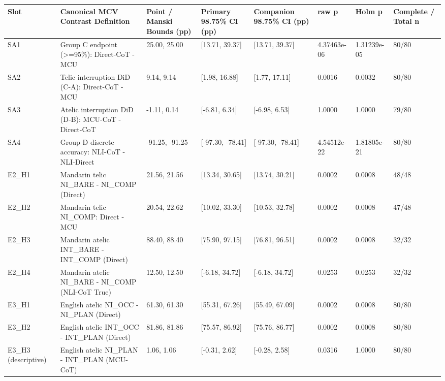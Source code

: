 \documentclass[11pt,a4paper]{article}
\begin{document}
\begin{center}\begingroup\small\setlength{\tabcolsep}{4.5pt}\renewcommand{\arraystretch}{1.12}\begin{adjustbox}{max width=\textwidth}\begin{tabular}{llllllll}\toprule
\textbf{Slot} & \textbf{Canonical MCV Contrast Definition} & \textbf{Point / Manski Bounds (pp)} & \textbf{Primary 98.75\% CI (pp)} & \textbf{Companion 98.75\% CI (pp)} & \textbf{raw p} & \textbf{Holm p} & \textbf{Complete / Total n} \\ \midrule
SA1 & Group C endpoint (>=95\%): Direct-CoT - MCU & 25.00, 25.00 & [13.71, 39.37] & [13.71, 39.37] & 4.37463e-06 & 1.31239e-05 & 80/80 \\
SA2 & Telic interruption DiD (C-A): Direct-CoT - MCU & 9.14, 9.14 & [1.98, 16.88] & [1.77, 17.11] & 0.0016 & 0.0032 & 80/80 \\
SA3 & Atelic interruption DiD (D-B): MCU-CoT - Direct-CoT & -1.11, 0.14 & [-6.81, 6.34] & [-6.98, 6.53] & 1.0000 & 1.0000 & 79/80 \\
SA4 & Group D discrete accuracy: NLI-CoT - NLI-Direct & -91.25, -91.25 & [-97.30, -78.41] & [-97.30, -78.41] & 4.54512e-22 & 1.81805e-21 & 80/80 \\
E2\_\allowbreak{}H1 & Mandarin telic NI\_\allowbreak{}BARE - NI\_\allowbreak{}COMP (Direct) & 21.56, 21.56 & [13.34, 30.65] & [13.74, 30.21] & 0.0002 & 0.0008 & 48/48 \\
E2\_\allowbreak{}H2 & Mandarin telic NI\_\allowbreak{}COMP: Direct - MCU & 20.54, 22.62 & [10.02, 33.30] & [10.53, 32.78] & 0.0002 & 0.0008 & 47/48 \\
E2\_\allowbreak{}H3 & Mandarin atelic INT\_\allowbreak{}BARE - INT\_\allowbreak{}COMP (Direct) & 88.40, 88.40 & [75.90, 97.15] & [76.81, 96.51] & 0.0002 & 0.0008 & 32/32 \\
E2\_\allowbreak{}H4 & Mandarin atelic NI\_\allowbreak{}BARE - NI\_\allowbreak{}COMP (NLI-CoT True) & 12.50, 12.50 & [-6.18, 34.72] & [-6.18, 34.72] & 0.0253 & 0.0253 & 32/32 \\
E3\_\allowbreak{}H1 & English atelic NI\_\allowbreak{}OCC - NI\_\allowbreak{}PLAN (Direct) & 61.30, 61.30 & [55.31, 67.26] & [55.49, 67.09] & 0.0002 & 0.0008 & 80/80 \\
E3\_\allowbreak{}H2 & English atelic INT\_\allowbreak{}OCC - INT\_\allowbreak{}PLAN (Direct) & 81.86, 81.86 & [75.57, 86.92] & [75.76, 86.77] & 0.0002 & 0.0008 & 80/80 \\
E3\_\allowbreak{}H3 (descriptive) & English atelic NI\_\allowbreak{}PLAN - INT\_\allowbreak{}PLAN (MCU-CoT) & 1.06, 1.06 & [-0.31, 2.62] & [-0.28, 2.58] & 0.0316 & 1.0000 & 80/80 \\

\end{tabular}
\end{adjustbox}
\end{center}
\end{document}
